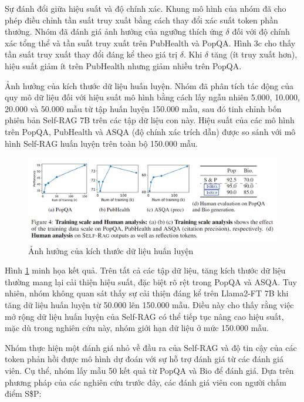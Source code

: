 \documentclass{article}
\begin{document}
Sự đánh đổi giữa hiệu suất và độ chính xác. Khung mô hình của nhóm đã cho phép điều chỉnh tần suất truy xuất bằng cách thay đổi xác suất token phần thưởng. Nhóm đã đánh giá ảnh hưởng của ngưỡng thích ứng $\delta$ đối với độ chính xác tổng thể và tần suất truy xuất trên PubHealth và PopQA. Hình 3c cho thấy tần suất truy xuất thay đổi đáng kể theo giá trị $\delta$. Khi $\delta$ tăng (ít truy xuất hơn), hiệu suất giảm ít trên PubHealth nhưng giảm nhiều trên PopQA.

Ảnh hưởng của kích thước dữ liệu huấn luyện. Nhóm đã phân tích tác động của quy mô dữ liệu đối với hiệu suất mô hình bằng cách lấy ngẫu nhiên 5.000, 10.000, 20.000 và 50.000 mẫu từ tập huấn luyện 150.000 mẫu, sau đó tinh chỉnh bốn phiên bản Self-RAG 7B trên các tập dữ liệu con này. Hiệu suất của các mô hình trên PopQA, PubHealth và ASQA (độ chính xác trích dẫn) được so sánh với mô hình Self-RAG huấn luyện trên toàn bộ 150.000 mẫu.

\begin{figure} 
    \centering
    \includegraphics[scale = 0.7]{training_scale.png}
    \caption{Ảnh hưởng của kích thước dữ liệu huấn luyện}
    \label{fig:training_scale}
\end{figure}

Hình \ref{fig:training_scale} minh họa kết quả. Trên tất cả các tập dữ liệu, tăng kích thước dữ liệu thường mang lại cải thiện hiệu suất, đặc biệt rõ rệt trong PopQA và ASQA. Tuy nhiên, nhóm không quan sát thấy sự cải thiện đáng kể trên Llama2-FT 7B khi tăng dữ liệu huấn luyện từ 50.000 lên 150.000 mẫu. Điều này cho thấy rằng việc mở rộng dữ liệu huấn luyện của Self-RAG có thể tiếp tục nâng cao hiệu suất, mặc dù trong nghiên cứu này, nhóm giới hạn dữ liệu ở mức 150.000 mẫu.

Nhóm thực hiện một đánh giá nhỏ về đầu ra của Self-RAG và độ tin cậy của các token phản hồi được mô hình dự đoán với sự hỗ trợ đánh giá từ các đánh giá viên. Cụ thể, nhóm lấy mẫu 50 kết quả từ PopQA và Bio để đánh giá. Dựa trên phương pháp của các nghiên cứu trước đây, các đánh giá viên con người chấm điểm S\$P:
\end{document}
